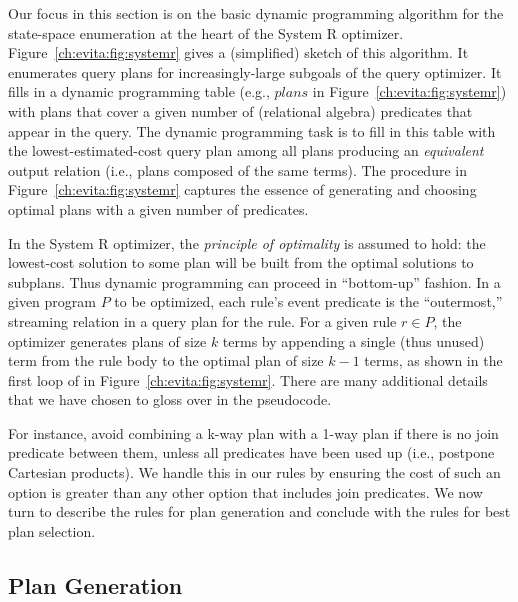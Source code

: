 Our focus in this section is on the basic dynamic programming algorithm for the
state-space enumeration at the heart of the System R optimizer.
Figure~\ref{ch:evita:fig:systemr} gives a (simplified) sketch of this
algorithm.  It enumerates query plans for increasingly-large subgoals of the
query optimizer.  It fills in a dynamic programming table (e.g., $plans$ in
Figure~\ref{ch:evita:fig:systemr}) with plans that cover a given number of
(relational algebra) predicates that appear in the query.  The dynamic
programming task is to fill in this table with the lowest-estimated-cost query
plan among all plans producing an {\em equivalent} output relation (i.e., plans
composed of the same terms).  The  procedure in
Figure~\ref{ch:evita:fig:systemr} captures the essence of generating and
choosing optimal plans with a given number of predicates.

In the System R optimizer, the {\em principle of optimality} is assumed to hold: the
lowest-cost solution to some plan will be built from the optimal solutions to
subplans.  Thus dynamic programming can proceed in ``bottom-up'' fashion.  In a
given program $P$ to be optimized, each rule's event predicate is the
``outermost,'' streaming relation in a query plan for the rule.  For a given
rule $r \in P$, the optimizer generates plans of size $k$ terms by appending a
single (thus unused) term from the rule body to the optimal plan of size $k-1$
terms, as shown in the first loop of  in Figure~\ref{ch:evita:fig:systemr}.
There are many additional details that we have chosen to gloss over in the
pseudocode.  

For instance, avoid combining a k-way plan with a 1-way plan if there is no
join predicate between them, unless all predicates have been used up (i.e.,
postpone Cartesian products).  We handle this in our \OVERLOG rules by ensuring
the cost of such an option is greater than any other option that includes join
predicates.  We now turn to describe the \OVERLOG rules for plan generation and
conclude with the rules for best plan selection.

\subsection{Plan Generation}
\label{ch:evita:sec:plangen}

